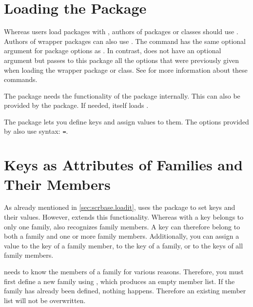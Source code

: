 \section{Loading the Package}

Whereas users load packages with , authors of packages or
classes should use . Authors of
wrapper packages can also use . The
 command has the same optional argument for package
options as . In contrast, 
does not have an optional argument but passes to this package all the options
that were previously given when loading the wrapper package or class. See
\cite{latex:clsguide} for more information about these commands.

The  package needs the functionality of the
 package internally. This can also be
provided by the  package. If needed,  itself
loads .

The  package lets you define keys and assign values to them.
The options provided by  also use  syntax:
\texttt{=}.


\section{Keys as Attributes of Families and Their Members}

As already mentioned in \autoref{sec:scrbase.loadit},  uses
the  package to set keys and their values. However,
 extends this functionality. Whereas with  a
key belongs to only one family,  also recognizes family
members. A key can therefore belong to both a family and one or more family
members. Additionally, you can assign a value to the key of a family member,
to the key of a family, or to the keys of all family members.

\begin{Declaration}
\end{Declaration}
 needs to know the members of a family for various reasons.
Therefore, you must first define a new family using ,
which produces an empty member list. If the family has already been defined,
nothing happens. Therefore an existing member list will not be overwritten.

